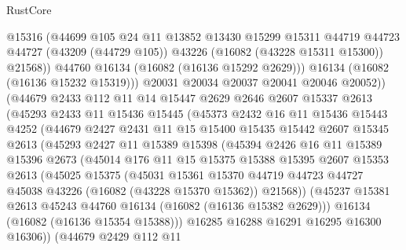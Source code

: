 \begin{lexlean}{RustCore}
\begin{coremodule}
                @15316
                (@44699
                  @105
                  @24
                  @11
                  @13852
                  @13430
                  @15299
                  @15311
                  @44719
                  @44723
                  @44727
                  (@43209 (@44729 @105))
                  @43226
                  (@16082 (@43228 @15311 @15300))
                  @21568))
              @44760
              @16134
              (@16082 (@16136 @15292 @2629)))
            @16134
            (@16082 (@16136 @15232 @15319)))
          @20031
          @20034
          @20037
          @20041
          @20046
          @20052))
      (@44679
        @2433
        @112
        @11
        @14
        @15447
        @2629
        @2646
        @2607
        @15337
        @2613
        (@45293
          @2433
          @11
          @15436
          @15445
          (@45373
            @2432
            @16
            @11
            @15436
            @15443
            @4252
            (@44679
              @2427
              @2431
              @11
              @15
              @15400
              @15435
              @15442
              @2607
              @15345
              @2613
              (@45293
                @2427
                @11
                @15389
                @15398
                (@45394
                  @2426
                  @16
                  @11
                  @15389
                  @15396
                  @2673
                  (@45014
                    @176
                    @11
                    @15
                    @15375
                    @15388
                    @15395
                    @2607
                    @15353
                    @2613
                    (@45025
                      @15375
                      (@45031
                        @15361
                        @15370
                        @44719
                        @44723
                        @44727
                        @45038
                        @43226
                        (@16082 (@43228 @15370 @15362))
                        @21568))
                    (@45237 @15381 @2613 @45243 @44760 @16134 (@16082 (@16136 @15382 @2629)))
                    @16134
                    (@16082 (@16136 @15354 @15388)))
                  @16285
                  @16288
                  @16291
                  @16295
                  @16300
                  @16306))
              (@44679
                @2429
                @112
                @11

\end{coremodule}
\end{lexlean}
